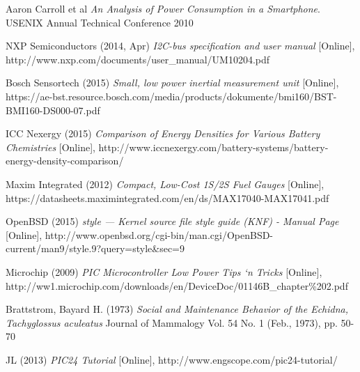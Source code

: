 \documentclass[12pt,openany,a4paper]{book}
\begin{document}
\begin{thebibliography}{99}
	Aaron Carroll et al \emph{An Analysis of Power Consumption in a Smartphone}.
	USENIX Annual Technical Conference 2010
	
	NXP Semiconductors (2014, Apr)
	\emph{I2C-bus specification and user manual} [Online],
	http://www.nxp.com/documents/user\_manual/UM10204.pdf
	
	Bosch Sensortech (2015)
	\emph{Small, low power inertial measurement unit} [Online], https://ae-bst.resource.bosch.com/media/products/dokumente/bmi160/BST-BMI160-DS000-07.pdf
	
	ICC Nexergy (2015)
	\emph{Comparison of Energy Densities for Various Battery Chemistries} [Online], http://www.iccnexergy.com/battery-systems/battery-energy-density-comparison/
	
	Maxim Integrated (2012)
	\emph{Compact, Low-Cost 1S/2S Fuel Gauges} [Online], https://datasheets.maximintegrated.com/en/ds/MAX17040-MAX17041.pdf
	
	OpenBSD (2015)
	\emph{style — Kernel source file style guide (KNF) - Manual Page} [Online], http://www.openbsd.org/cgi-bin/man.cgi/OpenBSD-current/man9/style.9?query=style\&sec=9
	
	Microchip (2009)
	\emph{PIC Microcontroller Low Power
		Tips ‘n Tricks} [Online], http://ww1.microchip.com/downloads/en/DeviceDoc/01146B\_chapter\%202.pdf
	
	Brattstrom, Bayard H. (1973)
	\emph{Social and Maintenance Behavior of the Echidna, Tachyglossus aculeatus}
	Journal of Mammalogy Vol. 54 No. 1 (Feb., 1973), pp. 50-70
	
	JL (2013)
	\emph{PIC24 Tutorial} [Online], http://www.engscope.com/pic24-tutorial/
\end{thebibliography}
\end{document}
